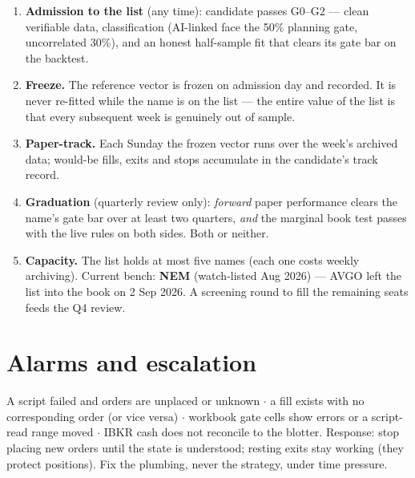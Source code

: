 \documentclass[11pt,a4paper]{article}
\begin{document}
\begin{enumerate}[leftmargin=1.6em, itemsep=2pt]
\item \textbf{Admission to the list} (any time): candidate passes G0--G2 ---
      clean verifiable data, classification (AI-linked face the 50\% planning
      gate, uncorrelated 30\%), and an honest half-sample fit that clears its
      gate bar on the backtest.
\item \textbf{Freeze.} The reference vector is frozen on admission day and
      recorded. It is never re-fitted while the name is on the list --- the
      entire value of the list is that every subsequent week is genuinely
      out of sample.
\item \textbf{Paper-track.} Each Sunday the frozen vector runs over the
      week's archived data; would-be fills, exits and stops accumulate in
      the candidate's track record.
\item \textbf{Graduation} (quarterly review only): \emph{forward} paper
      performance clears the name's gate bar over at least two quarters,
      \emph{and} the marginal book test passes with the live rules on both
      sides. Both or neither.
\item \textbf{Capacity.} The list holds at most five names (each one costs
      weekly archiving). Current bench: \textbf{NEM} (watch-listed Aug 2026)
      --- AVGO left the list into the book on 2 Sep 2026. A screening round
      to fill the remaining seats feeds the Q4 review.
\end{enumerate}

\section{Alarms and escalation}

\begin{tcolorbox}[colback=bcred!6, colframe=bcred, boxrule=0.8pt,
  title={\bfseries Act today (David, before next open)}, coltitle=white]
A script failed and orders are unplaced or unknown $\cdot$ a fill exists
with no corresponding order (or vice versa) $\cdot$ workbook gate cells
show errors or a script-read range moved $\cdot$ IBKR cash does not
reconcile to the blotter. Response: stop placing new orders until the state
is understood; resting exits stay working (they protect positions). Fix the
plumbing, never the strategy, under time pressure.
\end{tcolorbox}
\end{document}
